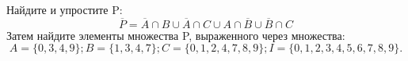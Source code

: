 \question
Найдите и упростите P:
\begin{equation*}
\overline{P} = \overline{A} \cap B \cup \overline{A} \cap C \cup A \cap \overline{B} \cup \overline{B} \cap C
\end{equation*}
Затем найдите элементы множества P, выраженного через множества:
\begin{equation*}
A = \{0, 3, 4, 9\}; 
B = \{1, 3, 4, 7\};
C = \{0, 1, 2, 4, 7, 8, 9\};
I = \{0, 1, 2, 3, 4, 5, 6, 7, 8, 9\}.
\end{equation*}